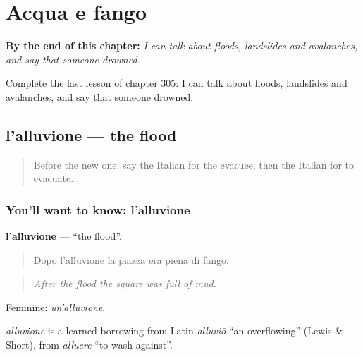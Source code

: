 
\chapter{Acqua e fango}
\label{ch:it-acqua-e-fango}

\begin{chapteropening}
\textbf{By the end of this chapter:} \emph{I can talk about floods, landslides and avalanches, and say that someone drowned.}

Complete the last lesson of chapter 305: I can talk about floods, landslides and avalanches, and say that someone drowned.
\end{chapteropening}

\section[l'alluvione]{l'alluvione — the flood}

\label{lesson:IT-C305-alluvione}



\begin{quote}
Before the new one: say the Italian for the evacuee, then the Italian for to evacuate.
\end{quote}

\subsection*{You'll want to know: l'alluvione}
\textbf{l'alluvione} — \textquotedblleft{}the flood\textquotedblright{}.

\begin{quote}
Dopo l'alluvione la piazza era piena di fango.
\end{quote}

\begin{quote}
\emph{After the flood the square was full of mud.}
\end{quote}

Feminine: \emph{un'alluvione}.

\begin{cousinweb}
\emph{alluvione} is a learned borrowing from Latin \emph{alluviō} \textquotedblleft{}an overflowing\textquotedblright{} (Lewis \& Short), from \emph{alluere} \textquotedblleft{}to wash against\textquotedblright{}.
\end{cousinweb}

